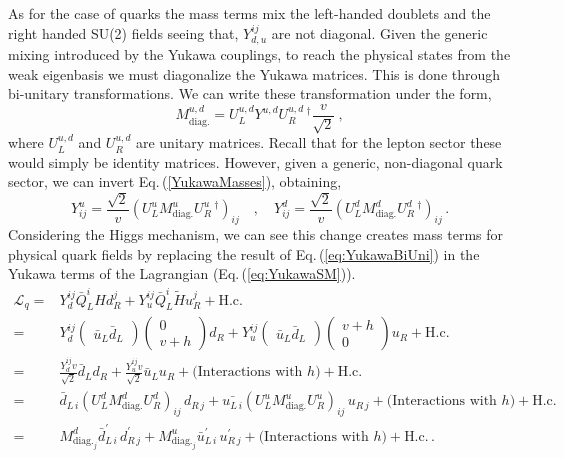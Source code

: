 \documentclass[10pt]{report}
\begin{document}
As for the case of quarks the mass terms mix the left-handed doublets and the right handed SU(2) fields seeing that, $Y_{d,u}^{ij}$ are not diagonal.
%
Given the generic mixing introduced by the Yukawa couplings, to reach the physical states from the weak eigenbasis we must diagonalize the Yukawa matrices. This is done through bi-unitary transformations. We can write these transformation under the form,
%
\begin{equation}
\label{YukawaMasses} 
M^{u,d}_{\text{diag.}}= U^{u,d}_L Y^{u,d} U^{u,d}_R\,^\dagger \frac{v}{\sqrt{2}} \ , 
\end{equation} 
%
where $U^{u,d}_L$ and $U^{u,d}_R$ are unitary matrices.  
%
Recall that for the lepton sector these would simply be identity matrices. 
%
However, given a generic, non-diagonal quark sector, we can invert Eq.\,(\ref{YukawaMasses}), obtaining,
%
\begin{equation}
\label{eq:YukawaBiUni}
Y^u_{ij} = \frac{\sqrt{2}}{v} (U_L^u M^u_{\text{diag.}} U_R^u\,^\dagger)_{ij} \quad , \quad Y^d_{ij} = \frac{\sqrt{2}}{v} (U_L^d M^d_{\text{diag.}} U_R^d\,^\dagger)_{ij} \, . 
\end{equation}
%
Considering the Higgs mechanism, we can see this change creates mass terms for physical quark fields by replacing the result of Eq.\,(\ref{eq:YukawaBiUni}) in the Yukawa terms of the Lagrangian (Eq.\,(\ref{eq:YukawaSM})).
%
\begin{equation}
\begin{split}
\mathcal{L}_{q} = &  Y_d^{ij} \bar{Q}^i_L H  d_R^j + Y_u^{ij} \bar{Q}^i_L \tilde{H} u_R^j + \text{H.c.}  \\
= & Y_d^{ij} \begin{pmatrix} \bar{u}_L \bar{d}_L \end{pmatrix} \begin{pmatrix} 0 \\ v+h \end{pmatrix} d_R + Y_u^{ij} \begin{pmatrix} \bar{u}_L \bar{d}_L \end{pmatrix} \begin{pmatrix} v+h \\ 0 \end{pmatrix} u_R + \text{H.c.} \\ 
= & \frac{ Y_d^{ij} v}{\sqrt{2}} \bar{d}_L d_R + \frac{ Y_u^{ij} v}{\sqrt{2}} \bar{u}_L u_R + \big(\text{Interactions with }h\big) + \text{H.c.} \\
= &  \bar{d}_{L\,i} (U_L^d M^d_{\text{diag.}} U_R^d)_{ij} \, d_{R\,j}  + \bar{u_{L\,i}} (U_L^u M^u_{\text{diag.}} U_R^u)_{ij}  \, u_{R\,j} + \big(\text{Interactions with } h\big) + \text{H.c.} \\ 
 = & M^d_{\text{diag.}_j} \bar{d}_{L\,i}^\prime \, d_{R\,j}^\prime  + M^u_{\text{diag.}_j} \bar{u}_{L\,i}^\prime \, u_{R\,j}^\prime + \big(\text{Interactions with }h\big) + \text{H.c.} \, .   
\end{split} 
\end{equation}
\end{document}
